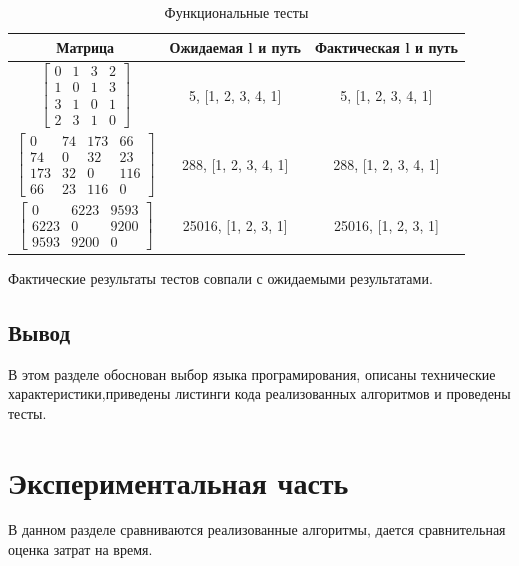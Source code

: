 \documentclass[a4paper,oneside,14pt]{extreport}
\begin{document}
\begin{table}[H]
	\caption{Функциональные тесты}
	\label{tab3}
	\begin{center}
		\begin{tabular}{ | c | c | c |}
			\hline
			\textbf{Матрица} & \textbf{Ожидаемая l и путь} & \textbf{Фактическая l и путь} \\ \hline
			$\begin{bmatrix} 
			0&1&3&2\\
			1&0&1&3\\
			3&1&0&1\\
			2&3&1&0
		\end{bmatrix}$ & 
		5, [1, 2, 3, 4, 1]
		& 
		5, [1, 2, 3, 4, 1] \\
		
		\hline
		$\begin{bmatrix} 
		0&74&173&66\\ 
		74&0&32&23 \\
		173&32&0&116\\
		66&23&116&0
		\end{bmatrix}$ & 
		288, [1, 2, 3, 4, 1]
		& 
		288, [1, 2, 3, 4, 1] \\
		
		\hline
		$\begin{bmatrix} 
		0&6223&9593\\
		6223&0&9200\\
		9593&9200&0
		\end{bmatrix}$ & 
		25016, [1, 2, 3, 1]
		& 
		25016, [1, 2, 3, 1] \\
		
		\hline
		
	\end{tabular}
	
\end{center}
\end{table} 
Фактические результаты тестов совпали с ожидаемыми результатами.

\section*{Вывод}
В этом разделе обоснован выбор языка програмирования, описаны технические характеристики,приведены листинги кода реализованных алгоритмов и проведены тесты.
\newpage

\chapter{Экспериментальная часть}
В данном разделе сравниваются реализованные алгоритмы, дается сравнительная оценка затрат на время.
\end{document}
